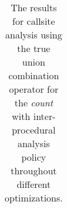 \begin{table}[!htbp]
{\begin{tabular}{|c|c}
    	\end{tabular}
}


		\caption {The results for callsite analysis using the true union combination operator for the \textit{count} with inter-procedural analysis policy throughout different optimizations.}
		\label{tbl:CStrueunionCOUNTinter}
\end{table}
%
%	
